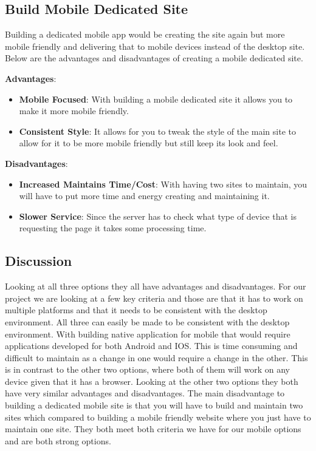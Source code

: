 \documentclass[onecolumn, draftclsnofoot,10pt, compsoc]{IEEEtran}
\begin{document}
		\subsection{Build Mobile Dedicated  Site}
		Building a dedicated mobile app would be creating the site again but more
		mobile friendly and delivering that to mobile devices instead of the desktop
		site. Below are the advantages and disadvantages of creating a mobile dedicated site.

		\textbf{Advantages}:
		\begin{itemize}
			\item \textbf{Mobile Focused}: With building a mobile dedicated site it allows
			you to make it more mobile friendly.
			\item \textbf{Consistent Style}: It allows for you to tweak the style of the
			main site to allow for it to be more mobile friendly but still keep its look
			and feel.
		\end{itemize}

		\textbf{Disadvantages}:
		\begin{itemize}
			\item \textbf{Increased Maintains Time/Cost}: With having two sites to maintain,
			you will have to put more time and energy creating and maintaining it.
			\item \textbf{Slower Service}: Since the server has to check what type of
			device that is requesting the page it takes some processing time.
		\end{itemize}
		\subsection{Discussion}
		Looking at all three options they all have advantages and disadvantages. For
		our project we are looking at a few key criteria and those are that it has to
		work on multiple platforms and that it needs to be consistent with the desktop
		environment. All three can easily be made to be consistent with the desktop
		environment. With building native application for mobile that would require
		applications developed for both Android and IOS. This is time consuming and
		difficult to maintain as a change in one would require a change in the other.
		This is in contrast to the other two options, where both of them will work on any device
		given that it has a browser. Looking at the other two options they both have very
		similar advantages and disadvantages. The main disadvantage to building a dedicated
		mobile site is that you will have to build and maintain two sites which compared to
		building a mobile friendly website where you just have to maintain one site.
		They both meet both criteria we have for our mobile options and are both strong
		options.
\end{document}
